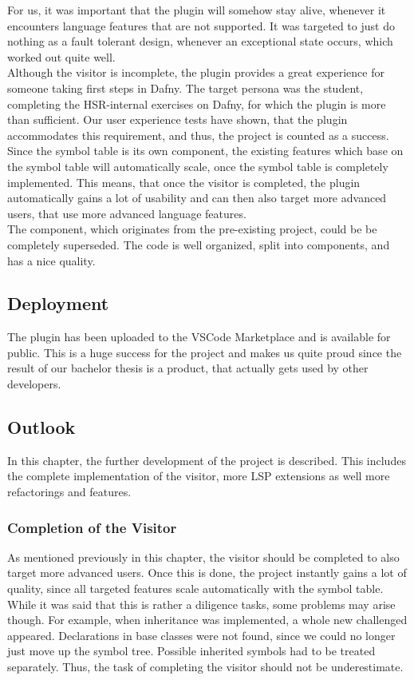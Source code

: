 For us, it was important that the plugin will somehow stay alive, whenever it encounters language features that are not supported.
It was targeted to just do nothing as a fault tolerant design, whenever an exceptional state occurs, which worked out quite well.\\

Although the visitor is incomplete, the plugin provides a great experience for someone taking first steps in Dafny.
The target persona was the student, completing the HSR-internal exercises on Dafny, for which the plugin is more than sufficient.
Our user experience tests have shown, that the plugin accommodates this requirement, and thus, the project is counted as a success.\\

Since the symbol table is its own component, the existing features which base on the symbol table will automatically scale, once the symbol table is completely implemented.
This means, that once the visitor is completed, the plugin automatically gains a lot of usability and can then also target more advanced users, that use more advanced language features.\\

The  component, which originates from the pre-existing project, could be be completely superseded.
The code is well organized, split into components, and has a nice quality.

\subsection{Deployment}
The plugin has been uploaded to the VSCode Marketplace and is available for public.
This is a huge success for the project and makes us quite proud since the result of our
bachelor thesis is a product, that actually gets used by other developers.

\subsection{Outlook}
In this chapter, the further development of the project is described.
This includes the complete implementation of the visitor, more LSP extensions as well more refactorings and features.

\subsubsection{Completion of the Visitor}
As mentioned previously in this chapter, the visitor should be completed to also target more advanced users.
Once this is done, the project instantly gains a lot of quality, since all targeted features scale automatically with the symbol table.
While it was said that this is rather a diligence tasks, some problems may arise though.
For example, when inheritance was implemented, a whole new challenged appeared.
Declarations in base classes were not found, since we could no longer just move up the symbol tree.
Possible inherited symbols had to be treated separately.
Thus, the task of completing the visitor should not be underestimate.

